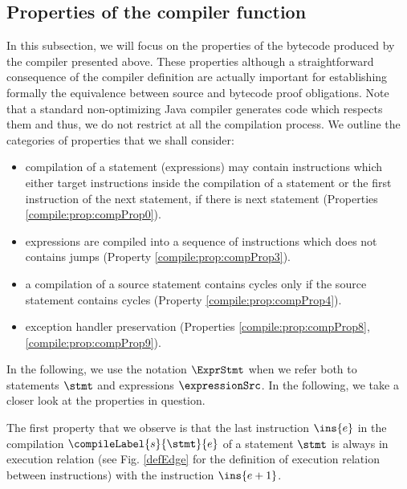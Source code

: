 \subsection{Properties of the compiler function}\label{compile:prop}
In this subsection, we will focus on the properties of the  bytecode produced by the compiler presented above.
These properties although a straightforward consequence of the compiler definition
 are actually important for establishing formally the equivalence between source and bytecode 
proof obligations. Note that a standard non-optimizing Java compiler generates code which respects them and thus, we
do not restrict at all the compilation process.  We outline the categories of properties that we shall consider:
\begin{itemize}
     
     \item compilation of a statement (expressions) may contain instructions which either target instructions inside the compilation of a statement or  the 
           first instruction of the next statement, if there is next statement (Properties \ref{compile:prop:compProp0}).
     
     \item expressions are compiled into a sequence of instructions which does not contains jumps (Property \ref{compile:prop:compProp3}).
     

     \item a compilation of a source statement contains cycles only if the source statement contains cycles (Property \ref{compile:prop:compProp4}).
     
     \item exception handler preservation (Properties \ref{compile:prop:compProp8}, \ref{compile:prop:compProp9}). %
     
\end{itemize}




In the following, we use the notation $\ExprStmt$ when we refer both to statements $\stmt$ and expressions $\expressionSrc$.
In the following, we take a closer look at the properties in question.
 
 The first property that we observe is that the last instruction $\ins{e}$ in the compilation
 $\compileLabel{s}{\stmt}{e}$  of a statement $\stmt$ is always in execution relation
 (see Fig. \ref{defEdge} for the definition of execution relation between instructions) with the
 instruction $\ins{e + 1}$.


